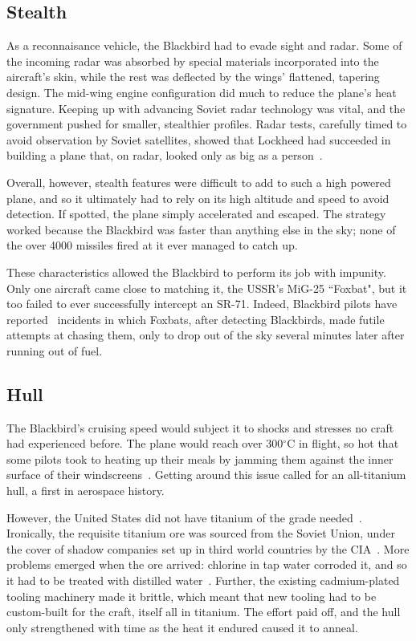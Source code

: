 \documentclass[12pt, draftclsnofoot, onecolumn]{IEEEtran}
\begin{document}
	\subsection*{Stealth}
	
		As a reconnaisance vehicle, the Blackbird had to evade sight and radar. Some of the incoming radar was absorbed by special materials incorporated into the aircraft's skin, while the rest was deflected by the wings' flattened, tapering design. The mid-wing engine configuration did much to reduce the plane's heat signature. Keeping up with advancing Soviet radar technology was vital, and the government pushed for smaller, stealthier profiles. Radar tests, carefully timed to avoid observation by Soviet satellites, showed that Lockheed had succeeded in building a plane that, on radar, looked only as big as a person~\cite{creating}.
		
		Overall, however, stealth features were difficult to add to such a high powered plane, and so it ultimately had to rely on its high altitude and speed to avoid detection. If spotted, the plane simply accelerated and escaped. The strategy worked because the Blackbird was faster than anything else in the sky; none of the over 4000\cite{sleddriver} missiles fired at it ever managed to catch up.
		
		These characteristics allowed the Blackbird to perform its job with impunity. Only one aircraft came close to matching it, the USSR's MiG-25 ``Foxbat", but it too failed to ever successfully intercept an SR-71. Indeed, Blackbird pilots have reported~\cite{sleddriver} incidents in which Foxbats, after detecting Blackbirds, made futile attempts at chasing them, only to drop out of the sky several minutes later after running out of fuel.
		
	\subsection*{Hull}
		The Blackbird's cruising speed would subject it to shocks and stresses no craft had experienced before. The plane would reach over 300$^\circ$C in flight, so hot that some pilots took to heating up their meals by jamming them against the inner surface of their windscreens~\cite{bbc}. Getting around this issue called for an all-titanium hull, a first in aerospace history.
		
		However, the United States did not have titanium of the grade needed~\cite{skunkworks}. Ironically, the requisite titanium ore was sourced from the Soviet Union, under the cover of shadow companies set up in third world countries by the CIA~\cite{bbc,skunkworks}. More problems emerged when the ore arrived: chlorine in tap water corroded it, and so it had to be treated with distilled water~\cite{skunkworks}. Further, the existing cadmium-plated tooling machinery made it brittle, which meant that new tooling had to be custom-built for the craft, itself all in titanium. The effort paid off, and the hull only strengthened with time as the heat it endured caused it to anneal.
		
\end{document}
